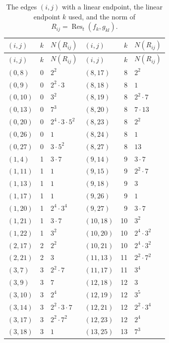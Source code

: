 \documentclass[11pt]{article}
\begin{document}
\begingroup\small
\setlength{\LTcapwidth}{\textwidth}
\begin{longtable}{@{}lrl@{\qquad}lrl@{}}
\caption{The edges $(i,j)$ with a linear endpoint, the linear endpoint $k$ used, and the norm of $R_{ij}=\operatorname{Res}_t(f_k,g_{kl})$.}\label{tab:sep}\\
\hline $(i,j)$ & $k$ & $N(R_{ij})$ & $(i,j)$ & $k$ & $N(R_{ij})$\\\hline\endfirsthead\hline $(i,j)$ & $k$ & $N(R_{ij})$ & $(i,j)$ & $k$ & $N(R_{ij})$\\\hline\endhead\hline\endfoot
$(0,8)$ & 0 & $2^{2}$ & $(8,17)$ & 8 & $2^{2}$\\
$(0,9)$ & 0 & $2^{2}\cdot 3$ & $(8,18)$ & 8 & $1$\\
$(0,10)$ & 0 & $3^{2}$ & $(8,19)$ & 8 & $2^{2}\cdot 7$\\
$(0,13)$ & 0 & $7^{3}$ & $(8,20)$ & 8 & $7\cdot 13$\\
$(0,20)$ & 0 & $2^{4}\cdot 3\cdot 5^{2}$ & $(8,23)$ & 8 & $2^{2}$\\
$(0,26)$ & 0 & $1$ & $(8,24)$ & 8 & $1$\\
$(0,27)$ & 0 & $3\cdot 5^{2}$ & $(8,27)$ & 8 & $13$\\
$(1,4)$ & 1 & $3\cdot 7$ & $(9,14)$ & 9 & $3\cdot 7$\\
$(1,11)$ & 1 & $1$ & $(9,15)$ & 9 & $2^{2}\cdot 7$\\
$(1,13)$ & 1 & $1$ & $(9,18)$ & 9 & $3$\\
$(1,17)$ & 1 & $1$ & $(9,26)$ & 9 & $1$\\
$(1,20)$ & 1 & $2^{4}\cdot 3^{4}$ & $(9,27)$ & 9 & $3\cdot 7$\\
$(1,21)$ & 1 & $3\cdot 7$ & $(10,18)$ & 10 & $3^{2}$\\
$(1,22)$ & 1 & $3^{2}$ & $(10,20)$ & 10 & $2^{4}\cdot 3^{2}$\\
$(2,17)$ & 2 & $2^{2}$ & $(10,21)$ & 10 & $2^{4}\cdot 3^{2}$\\
$(2,21)$ & 2 & $3$ & $(11,13)$ & 11 & $2^{2}\cdot 7^{2}$\\
$(3,7)$ & 3 & $2^{2}\cdot 7$ & $(11,17)$ & 11 & $3^{4}$\\
$(3,9)$ & 3 & $7$ & $(12,18)$ & 12 & $3$\\
$(3,10)$ & 3 & $2^{4}$ & $(12,19)$ & 12 & $3^{5}$\\
$(3,14)$ & 3 & $2^{2}\cdot 3\cdot 7$ & $(12,21)$ & 12 & $2^{2}\cdot 3^{4}$\\
$(3,17)$ & 3 & $2^{2}\cdot 7^{2}$ & $(12,23)$ & 12 & $2^{4}$\\
$(3,18)$ & 3 & $1$ & $(13,25)$ & 13 & $7^{3}$\\

\end{longtable}
\end{document}
